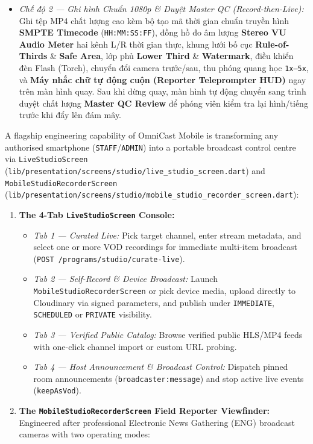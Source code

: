 {\begin{enumerate}[leftmargin=*,itemsep=2pt]
\begin{itemize}[leftmargin=*,itemsep=1pt]
    \item \emph{Chế độ 2 --- Ghi hình Chuẩn 1080p \& Duyệt Master QC (Record-then-Live):} Ghi tệp MP4 chất lượng cao kèm bộ tạo mã thời gian chuẩn truyền hình \textbf{SMPTE Timecode} (\texttt{HH:MM:SS:FF}), đồng hồ đo âm lượng \textbf{Stereo VU Audio Meter} hai kênh L/R thời gian thực, khung lưới bố cục \textbf{Rule-of-Thirds} \& \textbf{Safe Area}, lớp phủ \textbf{Lower Third} \& \textbf{Watermark}, điều khiển đèn Flash (Torch), chuyển đổi camera trước/sau, thu phóng quang học \texttt{1x--5x}, và \textbf{Máy nhắc chữ tự động cuộn (Reporter Teleprompter HUD)} ngay trên màn hình quay. Sau khi dừng quay, màn hình tự động chuyển sang trình duyệt chất lượng \textbf{Master QC Review} để phóng viên kiểm tra lại hình/tiếng trước khi đẩy lên đám mây.
  \end{itemize}
\end{enumerate}
}{
A flagship engineering capability of OmniCast Mobile is transforming any authorised smartphone (\texttt{STAFF}/\texttt{ADMIN}) into a portable broadcast control centre via \texttt{LiveStudioScreen} (\texttt{lib/presentation/screens/studio/live\_studio\_screen.dart}) and \texttt{MobileStudioRecorderScreen} (\texttt{lib/presentation/screens/studio/mobile\_studio\_recorder\_screen.dart}):
\begin{enumerate}[leftmargin=*,itemsep=2pt]
  \item \textbf{The 4-Tab \texttt{LiveStudioScreen} Console:}
  \begin{itemize}[leftmargin=*,itemsep=1pt]
    \item \emph{Tab 1 --- Curated Live:} Pick target channel, enter stream metadata, and select one or more VOD recordings for immediate multi-item broadcast (\texttt{POST /programs/studio/curate-live}).
    \item \emph{Tab 2 --- Self-Record \& Device Broadcast:} Launch \texttt{MobileStudioRecorderScreen} or pick device media, upload directly to Cloudinary via signed parameters, and publish under \texttt{IMMEDIATE}, \texttt{SCHEDULED} or \texttt{PRIVATE} visibility.
    \item \emph{Tab 3 --- Verified Public Catalog:} Browse verified public HLS/MP4 feeds with one-click channel import or custom URL probing.
    \item \emph{Tab 4 --- Host Announcement \& Broadcast Control:} Dispatch pinned room announcements (\texttt{broadcaster:message}) and stop active live events (\texttt{keepAsVod}).
  \end{itemize}
  \item \textbf{The \texttt{MobileStudioRecorderScreen} Field Reporter Viewfinder:} Engineered after professional Electronic News Gathering (ENG) broadcast cameras with two operating modes:

\end{enumerate}}

